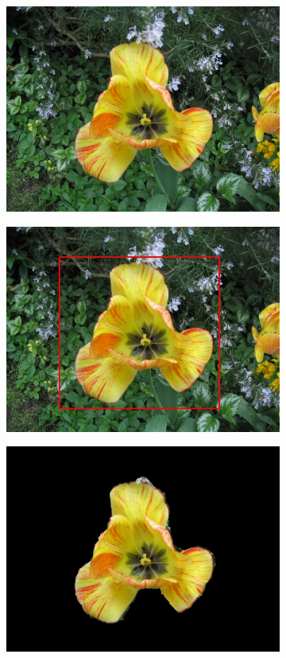\documentclass[a4paper,11]{article}
\begin{document}
  \begin{center}
  \begin{figure}[H]
    \begin{subfigure}{.33\textwidth}
      \centering
      \includegraphics[width=0.9\linewidth]{images/flower.jpg}
    \end{subfigure}
    \begin{subfigure}{.33\textwidth}
      \centering
      \includegraphics[width=0.9\linewidth]{results/input/flower}
    \end{subfigure}
    \begin{subfigure}{0.33\textwidth}
      \centering
      \includegraphics[width=0.9\linewidth]{results/flower}

\end{subfigure}
\end{figure}
\end{center}
\end{document}
